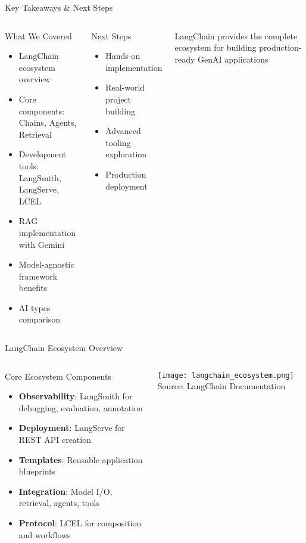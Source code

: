 \documentclass[8pt]{beamer}
\begin{document}
\begin{frame}{Key Takeaways \& Next Steps}
  \begin{columns}[T]
    \begin{block}{What We Covered}
      \begin{itemize}
        \item LangChain ecosystem overview
        \item Core components: Chains, Agents, Retrieval
        \item Development tools: LangSmith, LangServe, LCEL
        \item RAG implementation with Gemini
        \item Model-agnostic framework benefits
        \item AI types comparison
      \end{itemize}
    \end{block}
    
    \begin{block}{Next Steps}
      \begin{itemize}
        \item Hands-on implementation
        \item Real-world project building
        \item Advanced tooling exploration
        \item Production deployment
      \end{itemize}
    \end{block}
    
    \begin{tcolorbox}[colback=lightpurple!10,colframe=westernpurple,title=Remember]
      LangChain provides the complete ecosystem for building production-ready GenAI applications
    \end{tcolorbox}
  \end{columns}
\end{frame}

\begin{frame}{LangChain Ecosystem Overview}
  \begin{columns}[T]
    \begin{block}{Core Ecosystem Components}
      \begin{itemize}
        \item \textbf{Observability}: LangSmith for debugging, evaluation, annotation
        \item \textbf{Deployment}: LangServe for REST API creation
        \item \textbf{Templates}: Reusable application blueprints
        \item \textbf{Integration}: Model I/O, retrieval, agents, tools
        \item \textbf{Protocol}: LCEL for composition and workflows
      \end{itemize}
    \end{block}
    
    \centering
    \texttt{[image: langchain\_ecosystem.png]}
    \scriptsize{Source: LangChain Documentation}
  \end{columns}
\end{frame}
\end{document}
